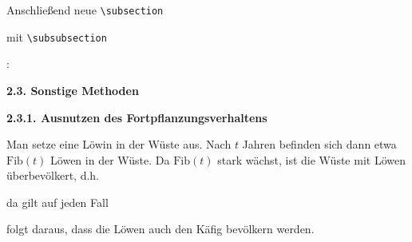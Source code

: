 \begin{frame}[fragile]
	\Aufgabee
		Anschließend neue \lstinline[basicstyle=\normalfont\normalsize]|\subsection|
		
		\textrm{}
		
		mit \lstinline[basicstyle=\normalfont\normalsize]|\subsubsection|
		
		\textrm{}:
	\begin{outputbox}
    { \Large\textbf{2.3. Sonstige Methoden}}
		
    { \large\textbf{2.3.1. Ausnutzen des Fortpflanzungsverhaltens} } 

    Man setze eine Löwin in der Wüste aus. Nach $t$ Jahren befinden sich dann etwa $\mathrm{Fib}(t)$ Löwen in der Wüste. Da $\mathrm{Fib}(t)$ stark wächst, ist die Wüste mit Löwen überbevölkert, d.h.

    da gilt auf jeden Fall

    folgt daraus, dass die Löwen auch den Käfig bevölkern werden.
    \end{outputbox}
	\vspace{0.3cm}
\end{frame}
